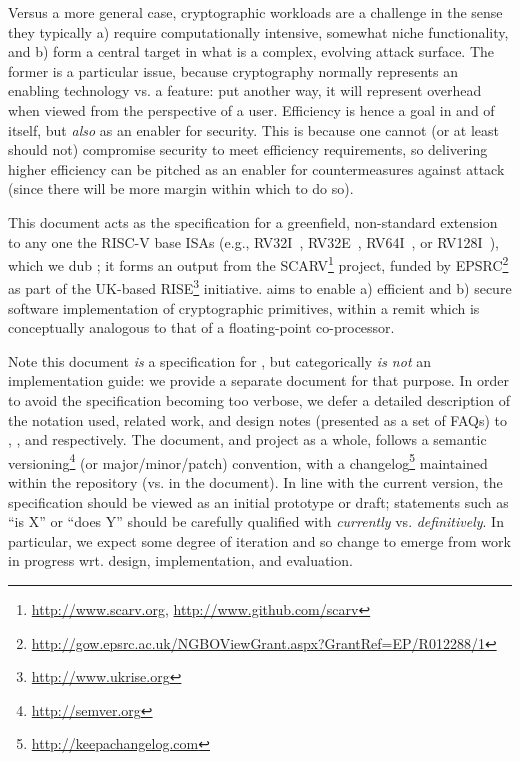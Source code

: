 
Versus a more general case, cryptographic workloads are a challenge in the
sense they typically
a) require computationally intensive, somewhat niche functionality,
   and
b) form a central target in what is a complex, evolving attack surface.
The former is a particular issue, because cryptography normally represents
an enabling technology vs. a feature: put another way, it will represent
overhead when viewed from the perspective of a user.  Efficiency is hence 
a goal in and of itself, but {\em also} as an enabler for security.  This 
is because one cannot (or at least should not) compromise security to meet 
efficiency requirements, so delivering higher efficiency can be pitched as 
an enabler for countermeasures against attack (since there will be more 
margin within which to do so).

This document acts as the specification for a 
greenfield, non-standard extension~\cite[Section 21.1]{SCARV:RV:ISA:I:17} 
to any one the RISC-V base ISAs
(e.g., RV32I~\cite[Section 2]{SCARV:RV:ISA:I:17}, RV32E~\cite[Section 3]{SCARV:RV:ISA:I:17}, RV64I~\cite[Section 4]{SCARV:RV:ISA:I:17}, or RV128I~\cite[Section 5]{SCARV:RV:ISA:I:17}),
which we dub \XCID; it forms an output from the SCARV\footnote{
\url{http://www.scarv.org}, \url{http://www.github.com/scarv}
} project, funded by EPSRC\footnote{
\url{http://gow.epsrc.ac.uk/NGBOViewGrant.aspx?GrantRef=EP/R012288/1}
} as part of the UK-based RISE\footnote{
\url{http://www.ukrise.org}
} initiative.  
\XCID aims to enable
a) efficient
   and
b) secure
software implementation of cryptographic primitives, within a remit which
is conceptually analogous to that of a floating-point co-processor.

Note this document {\em is} a specification for \XCID, but categorically
{\em is not} an implementation guide: we provide a separate document for 
that purpose.  In order to avoid the specification becoming too verbose,
we defer a detailed description of the notation used, related work, and 
design notes (presented as a set of FAQs) to
,
,
and
respectively.  The document, and project as a whole, follows a semantic 
versioning\footnote{
\url{http://semver.org}
} (or major/minor/patch) convention, with a changelog\footnote{
\url{http://keepachangelog.com}
} maintained within the repository (vs. in the document).
In line with the current version, the specification should be viewed as an
initial prototype or draft; statements such as 
``\XCID is   X'' 
or
``\XCID does Y''
should be carefully qualified with {\em currently} vs. {\em definitively}.  
In particular, we expect some degree of iteration and so change to emerge 
from work in progress wrt. design, implementation, and evaluation.

